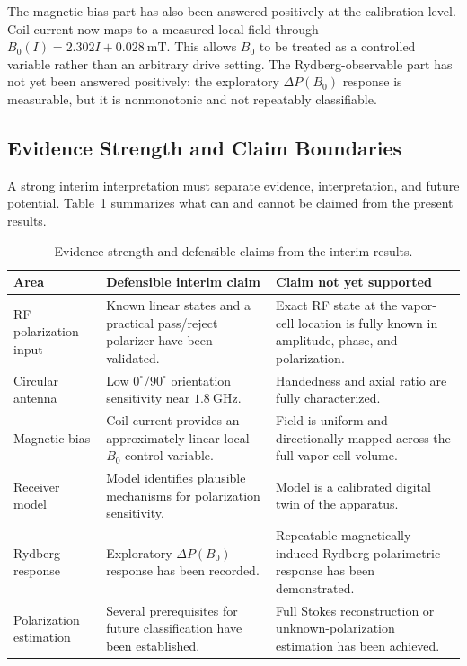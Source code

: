 \documentclass{ieeeaccess}
\begin{document}
The magnetic-bias part has also been answered positively at the calibration level. Coil current now maps to a measured local field through \(B_0(I)=2.302I+0.028~\mathrm{mT}\). This allows \(B_0\) to be treated as a controlled variable rather than an arbitrary drive setting. The Rydberg-observable part has not yet been answered positively: the exploratory \(\Delta P(B_0)\) response is measurable, but it is nonmonotonic and not repeatably classifiable.

\subsection{Evidence Strength and Claim Boundaries}
\label{subsec:discussion_claim_boundaries}

A strong interim interpretation must separate evidence, interpretation, and future potential. Table~\ref{tab:discussion_claim_boundaries} summarizes what can and cannot be claimed from the present results.

\begin{table}[!t]
\caption{Evidence strength and defensible claims from the interim results.}
\label{tab:discussion_claim_boundaries}
\centering
\renewcommand{\arraystretch}{1.10}
\scriptsize
\begin{tabular}{p{} p{} p{}}
\hline
\textbf{Area} & \textbf{Defensible interim claim} & \textbf{Claim not yet supported} \\
\hline
RF polarization input & Known linear states and a practical pass/reject polarizer have been validated. & Exact RF state at the vapor-cell location is fully known in amplitude, phase, and polarization. \\
Circular antenna & Low \(0^\circ/90^\circ\) orientation sensitivity near \(1.8~\mathrm{GHz}\). & Handedness and axial ratio are fully characterized. \\
Magnetic bias & Coil current provides an approximately linear local \(B_0\) control variable. & Field is uniform and directionally mapped across the full vapor-cell volume. \\
Receiver model & Model identifies plausible mechanisms for polarization sensitivity. & Model is a calibrated digital twin of the apparatus. \\
Rydberg response & Exploratory \(\Delta P(B_0)\) response has been recorded. & Repeatable magnetically induced Rydberg polarimetric response has been demonstrated. \\
Polarization estimation & Several prerequisites for future classification have been established. & Full Stokes reconstruction or unknown-polarization estimation has been achieved. \\
\hline
\end{tabular}
\end{table}
\end{document}
